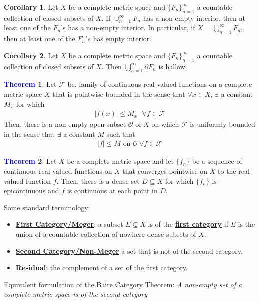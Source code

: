 \documentclass[11pt]{article}
\newcommand{\open}[0]{\mathcal{O}}
\theoremstyle{definition}
\theoremstyle{definition}
\newcommand{\dfn}[1]{\underline{\textbf{#1}}}
\newtheorem{theorem}{\textcolor{blue}{Theorem}}
\newtheorem{corollary}{Corollary}
\theoremstyle{definition}
\theoremstyle{remark}
\begin{document}
\begin{corollary}
	Let $X$ be a complete metric space and $\{ F_n \}_{n=1}^\infty$ a countable collection of closed subsets of $X$. If $\cup_{n=1}^\infty F_n$ has a non-empty interior, then at least one of the $F_n$'s has a non-empty interior. In particular, if $X = \bigcup_{n=1}^\infty F_n$, then at least one of the $F_n's$ has empty interior. 
\end{corollary}


\begin{corollary}
	Let $X$ be a complete metric space and $\{ F_n \}_{n=1}^\infty$ a countable collection of closed subsets of $X$. Then $\bigcup_{n=1}^\infty \partial F_n$ is hallow. 
\end{corollary}

\begin{theorem}
	Let $\mathcal{F}$ be. family of continuous real-valued functions on a complete metric space $X$ that is pointwise bounded in the sense that $\forall x \in X$, $\exists$ a constant $M_x$ for which 
	\begin{align}
		|f(x) | \leq M_x \text{ } \forall f \in \mathcal{F} 	
	\end{align}
	Then, there is a non-empty open subset $\open$ of $X$ on which $\mathcal{F}$ is uniformly bounded in the sense that $\exists$ a constant $M$ such that 
	\begin{align}
		|f| \leq M \text{ on } \open\ \forall f \in \mathcal{F} 	
	\end{align}
\end{theorem}


\begin{theorem}
	Let $X$ be a complete metric space and let $\{ f_n \}$ be a sequence of continuous real-valued functions on $X$ that converges pointwise on $X$ to the real-valued function $f$. Then, there is a dense set $D \subseteq X$ for which $\{ f_n \}$ is epicontinuous and $f$ is continuous at each point in $D$. 
\end{theorem}

Some standard terminology: 
\begin{itemize}[noitemsep]
	\item \dfn{First Category/Meger}: a subset $E \subseteq X$ is of the \dfn{first category} if $E$ is the union of a countable collection of nowhere dense subsets of $X$. 
	\item \dfn{Second Category/Non-Meger} a set that is not of the second category. 
	\item \dfn{Residual}: the complement of a set of the first category. 
\end{itemize}
Equivalent formulation of the Baire Category Theorem: \emph{A non-empty set of a complete metric space is of the second category}
\end{document}
